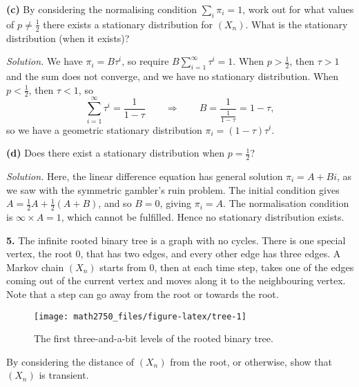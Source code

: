 \documentclass[
  a4paper,
]{article}
\theoremstyle{definition}
\theoremstyle{definition}
\theoremstyle{definition}
\theoremstyle{remark}
\begin{document}
\textbf{(c)} By considering the normalising condition \(\sum_i \pi_i =1\), work out for what values of \(p \neq \frac12\) there exists a stationary distribution for \((X_n)\). What is the stationary distribution (when it exists)?

\begin{myanswers}

\emph{Solution.} We have \(\pi_i = B\tau^i\), so require \(B \sum_{i=1}^\infty \tau^i = 1\). When \(p > \frac12\), then \(\tau > 1\) and the sum does not converge, and we have no stationary distribution. When \(p < \frac12\), then \(\tau < 1\), so
\[ \sum_{i=1}^\infty \tau^i = \frac{1}{1-\tau} \qquad \Rightarrow \qquad B = \frac{1}{\frac{1}{1-\tau}} = 1 - \tau, \]
so we have a geometric stationary distribution \(\pi_i = (1-\tau)\tau^i\).

\end{myanswers}

\textbf{(d)} Does there exist a stationary distribution when \(p = \frac12\)?

\begin{myanswers}

\emph{Solution.}
Here, the linear difference equation has general solution \(\pi_i = A + Bi\), as we saw with the symmetric gambler's ruin problem. The initial condition gives \(A = \frac12A + \frac12(A + B)\), and so \(B = 0\), giving \(\pi_i = A\). The normalisation condition is \(\infty \times A = 1\), which cannot be fulfilled. Hence no stationary distribution exists.

\end{myanswers}

\textbf{5.} The infinite rooted binary tree is a graph with no cycles. There is one special vertex, the root 0, that has two edges, and every other edge has three edges. A Markov chain \((X_n)\) starts from 0, then at each time step, takes one of the edges coming out of the current vertex and moves along it to the neighbouring vertex. Note that a step can go away from the root or towards the root.

\begin{figure}

{\centering \texttt{[image: math2750\_files/figure-latex/tree-1]} 

}

\caption{The first three-and-a-bit levels of the rooted binary tree.}\label{fig:tree}
\end{figure}

By considering the distance of \((X_n)\) from the root, or otherwise, show that \((X_n)\) is transient.
\end{document}
